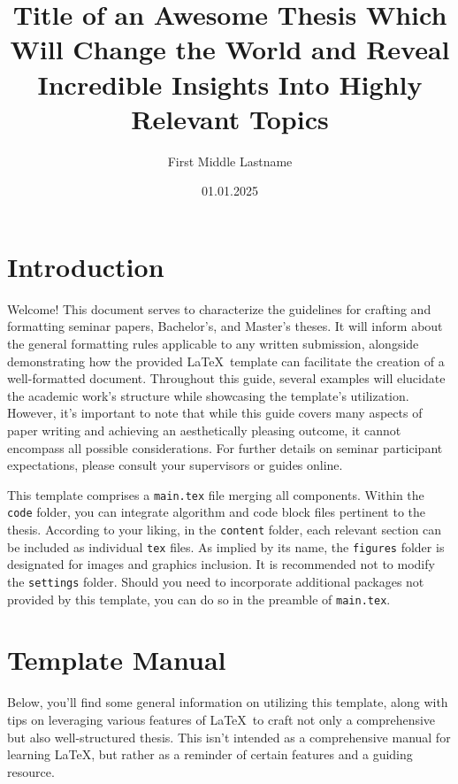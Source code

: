 \documentclass[
    language=german, %
    thesis=bachelor, %
    supervisor=postdoc, %
    multiauthor=false, %
    ]{settings/csssa-thesis}
\title{Title of an Awesome Thesis Which Will Change the World and Reveal Incredible Insights Into Highly Relevant Topics}
\author{First Middle Lastname}
\date{01.01.2025}
\begin{document}
\maketitlepage
\maketitle

\begin{abstract}
    \lipsum[1]
\end{abstract}

\section{Introduction}

Welcome! This document serves to characterize the guidelines for crafting and formatting seminar papers, Bachelor's, and Master's theses. It will inform about the general formatting rules applicable to any written submission, alongside demonstrating how the provided \LaTeX\ template can facilitate the creation of a well-formatted document. Throughout this guide, several examples will elucidate the academic work's structure while showcasing the template's utilization. However, it's important to note that while this guide covers many aspects of paper writing and achieving an aesthetically pleasing outcome, it cannot encompass all possible considerations. For further details on seminar participant expectations, please consult your supervisors or guides online.

This template comprises a \texttt{main.tex} file merging all components. Within the \texttt{code} folder, you can integrate algorithm and code block files pertinent to the thesis. According to your liking, in the \texttt{content} folder, each relevant section can be included as individual \texttt{tex} files. As implied by its name, the \texttt{figures} folder is designated for images and graphics inclusion. It is recommended not to modify the \texttt{settings} folder. Should you need to incorporate additional packages not provided by this template, you can do so in the preamble of \texttt{main.tex}.

\section{Template Manual}\label{ch02:manual}

Below, you'll find some general information on utilizing this template, along with tips on leveraging various features of \LaTeX\ to craft not only a comprehensive but also well-structured thesis. This isn't intended as a comprehensive manual for learning \LaTeX, but rather as a reminder of certain features and a guiding resource.
\end{document}
